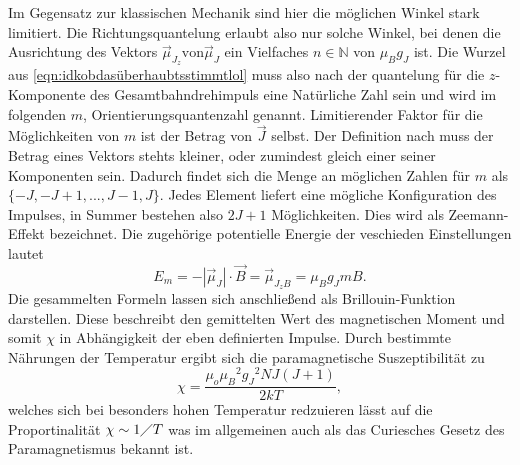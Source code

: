 Im Gegensatz zur klassischen Mechanik sind hier die möglichen Winkel stark limitiert. Die Richtungsquantelung erlaubt also nur solche Winkel, 
bei denen die Ausrichtung des Vektors $\vec{\mu}_{J_z} \text{von}  \vec{\mu}_J$ ein Vielfaches $n \in \mathbb{N} $ von $\mu_B g_J$ ist. 
Die Wurzel aus \eqref{eqn:idkobdasüberhaubtsstimmtlol} muss also nach der quantelung für die $z$-Komponente des Gesamtbahndrehimpuls
eine Natürliche Zahl sein und wird im folgenden $m$, Orientierungsquantenzahl genannt.
Limitierender Faktor für die Möglichkeiten von $m$ ist der Betrag von $\vec{J}$ selbst. Der Definition nach muss der 
Betrag eines Vektors stehts kleiner, oder zumindest gleich einer seiner Komponenten sein. Dadurch findet sich die Menge an 
möglichen Zahlen für $m$ als $\{-J,-J+1,...,J-1,J\}$. Jedes Element liefert eine mögliche Konfiguration des Impulses, in Summer 
bestehen also $2J+1$ Möglichkeiten. Dies wird als Zeemann-Effekt bezeichnet. Die zugehörige potentielle Energie der veschieden Einstellungen lautet
\begin{equation}
    E_m=-|\vec{\mu}_J|\cdot\vec{B}  = \vec{\mu}_{{J_z}B}= \mu_B g_J mB.
\end{equation}
Die gesammelten Formeln lassen sich anschließend als Brillouin-Funktion darstellen. Diese beschreibt den gemittelten Wert 
des magnetischen Moment und somit $\chi$ in Abhängigkeit der eben definierten Impulse. Durch bestimmte Nährungen der Temperatur ergibt sich
die paramagnetische Suszeptibilität zu
\begin{equation}
    \label{eqn:CHIIII}
    \chi =  \frac{\mu_o {\mu_B}^2 {g_J}^2 N J(J+1) }{2kT},
\end{equation}
welches sich bei besonders hohen Temperatur redzuieren lässt auf die Proportinalität $\chi \sim 1 \diagup T$ was im allgemeinen
auch als das Curiesches Gesetz des Paramagnetismus bekannt ist.


